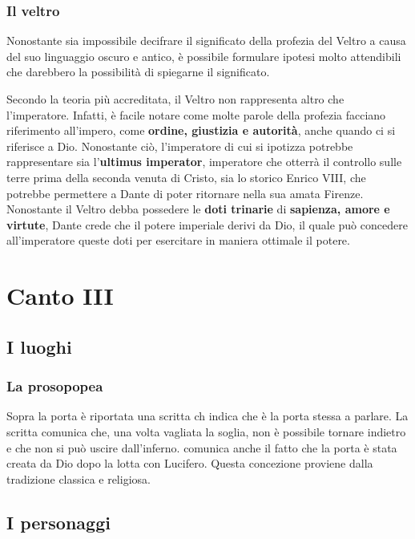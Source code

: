 \documentclass[10pt,a4paper]{article}
\begin{document}
		\subsubsection{Il veltro}
		
		Nonostante sia impossibile decifrare il significato della profezia del Veltro a causa del suo linguaggio oscuro e antico, è possibile formulare ipotesi molto attendibili che darebbero la possibilità di spiegarne il significato.
		
		Secondo la teoria più accreditata, il Veltro non rappresenta altro che l'imperatore. Infatti, è facile notare come molte parole della profezia facciano riferimento all'impero, come \textbf{ordine, giustizia e autorità}, anche quando ci si riferisce a Dio. Nonostante ciò, l'imperatore di cui si ipotizza potrebbe rappresentare sia l'\textbf{ultimus imperator}, imperatore che otterrà il controllo sulle terre prima della seconda venuta di Cristo, sia lo storico Enrico VIII, che potrebbe permettere a Dante di poter ritornare nella sua amata Firenze. Nonostante il Veltro debba possedere le \textbf{doti trinarie} di \textbf{sapienza, amore e virtute}, Dante crede che il potere imperiale derivi da Dio, il quale può concedere all'imperatore queste doti per esercitare in maniera ottimale il potere.
		
	\section{Canto III}
	
		\subsection{I luoghi}
		
		\subsubsection{La prosopopea}
		
		Sopra la porta è riportata una scritta ch indica che è la porta stessa a parlare. La scritta comunica che, una volta vagliata la soglia, non è possibile tornare indietro e che non si può uscire dall'inferno. comunica anche il fatto che la porta è stata creata da Dio dopo la lotta con Lucifero. Questa concezione proviene dalla tradizione classica e religiosa.
		
		\subsection{I personaggi}
		
\end{document}
